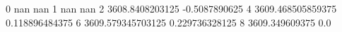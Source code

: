 0 nan nan
1 nan nan
2 3608.8408203125 -0.5087890625
4 3609.468505859375 0.118896484375
6 3609.579345703125 0.229736328125
8 3609.349609375 0.0
